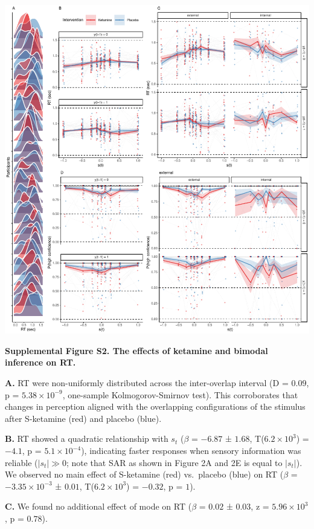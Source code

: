 \documentclass[
]{article}
\begin{document}
\includegraphics{modes_ketamine_scz_files/figure-latex/Supplemental_Figure_S2-1.pdf}

\textbf{Supplemental Figure S2. The effects of ketamine and bimodal
inference on RT.}

\textbf{A.} RT were non-uniformly distributed across the inter-overlap
interval (D = \(0.09\), p = \(\ensuremath{5.38\times 10^{-9}}\),
one-sample Kolmogorov-Smirnov test). This corroborates that changes in
perception aligned with the overlapping configurations of the stimulus
after S-ketamine (red) and placebo (blue).

\textbf{B.} RT showed a quadratic relationship with \(s_t\) (\(\beta\) =
\(-6.87\) ± \(1.68\), T(\(\ensuremath{6.2\times 10^{3}}\)) = \(-4.1\), p
= \(\ensuremath{5.1\times 10^{-4}}\)), indicating faster responses when
sensory information was reliable (\(|s_t| \gg  0\); note that SAR as
shown in Figure 2A and 2E is equal to \(|s_t|\)). We observed no main
effect of S-ketamine (red) vs.~placebo (blue) on RT (\(\beta\) =
\(\ensuremath{-3.35\times 10^{-3}}\) ± \(0.01\),
T(\(\ensuremath{6.2\times 10^{3}}\)) = \(-0.32\), p = \(1\)).

\textbf{C.} We found no additional effect of mode on RT (\(\beta\) =
\(0.02\) ± \(0.03\), z = \(\ensuremath{5.96\times 10^{3}}\), p =
\(0.78\)).
\end{document}
